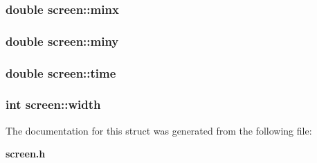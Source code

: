 \subsubsection[{minx}]{\setlength{\rightskip}{0pt plus 5cm}double {\bf screen::minx}}\label{structscreen_ce1577a6c8685aa8aabb3008346ee014}


\subsubsection[{miny}]{\setlength{\rightskip}{0pt plus 5cm}double {\bf screen::miny}}\label{structscreen_e58c495356145ced9399aa6fe2fe36e4}


\subsubsection[{time}]{\setlength{\rightskip}{0pt plus 5cm}double {\bf screen::time}}\label{structscreen_823fed6a66633783f3d828ac2fdf21dd}


\subsubsection[{width}]{\setlength{\rightskip}{0pt plus 5cm}int {\bf screen::width}}\label{structscreen_5a1821f8d8c202dfbf0755d2162fb64b}




The documentation for this struct was generated from the following file:\begin{CompactItemize}
\item 
{\bf screen.h}\end{CompactItemize}
